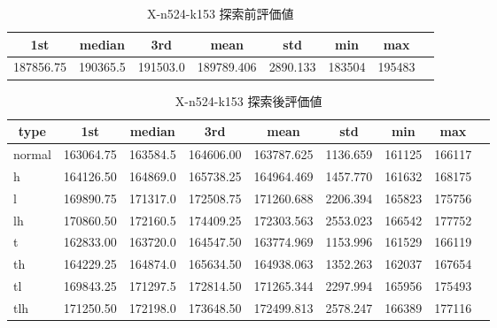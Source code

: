 \begin{table}[htbp]
    \caption{X-n524-k153 探索前評価値}
    \begin{tabular}{|l|l|l|l|l|l|l|l|}\hline
    \multicolumn{1}{|c|}{\textbf{1st}}
    &\multicolumn{1}{c|}{\textbf{median}}
    &\multicolumn{1}{c|}{\textbf{3rd}}
    &\multicolumn{1}{c|}{\textbf{mean}}
    &\multicolumn{1}{c|}{\textbf{std}}
    &\multicolumn{1}{c|}{\textbf{min}}
    &\multicolumn{1}{c|}{\textbf{max}}\\\hline
	187856.75 & 190365.5 & 191503.0 & 189789.406 & 2890.133 & 183504 & 195483\\\hline
	\end{tabular}
\end{table}
\begin{table}[htbp]
    \caption{X-n524-k153 探索後評価値}
    \begin{tabular}{|l|l|l|l|l|l|l|l|l|}\hline
    \multicolumn{1}{|c|}{\textbf{type}}
    &\multicolumn{1}{|c|}{\textbf{1st}}
    &\multicolumn{1}{c|}{\textbf{median}}
    &\multicolumn{1}{c|}{\textbf{3rd}}
    &\multicolumn{1}{c|}{\textbf{mean}}
    &\multicolumn{1}{c|}{\textbf{std}}
    &\multicolumn{1}{c|}{\textbf{min}}
    &\multicolumn{1}{c|}{\textbf{max}}\\\hline
	normal & 163064.75 & 163584.5 & 164606.00 & 163787.625 & 1136.659 & 161125 & 166117\\\hline
	h & 164126.50 & 164869.0 & 165738.25 & 164964.469 & 1457.770 & 161632 & 168175\\\hline
	l & 169890.75 & 171317.0 & 172508.75 & 171260.688 & 2206.394 & 165823 & 175756\\\hline
	lh & 170860.50 & 172160.5 & 174409.25 & 172303.563 & 2553.023 & 166542 & 177752\\\hline
	t & 162833.00 & 163720.0 & 164547.50 & 163774.969 & 1153.996 & 161529 & 166119\\\hline
	th & 164229.25 & 164874.0 & 165634.50 & 164938.063 & 1352.263 & 162037 & 167654\\\hline
	tl & 169843.25 & 171297.5 & 172814.50 & 171265.344 & 2297.994 & 165956 & 175493\\\hline
	tlh & 171250.50 & 172198.0 & 173648.50 & 172499.813 & 2578.247 & 166389 & 177116\\\hline
	\end{tabular}
\end{table}
